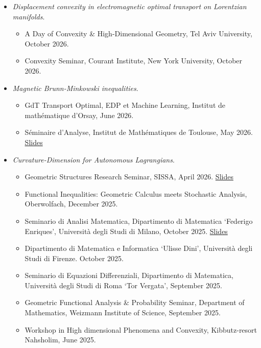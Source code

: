 \documentclass[margin, 10pt]{res}
\begin{document}
\begin{resume}
    \begin{itemize}
        \item {\it Displacement convexity in electromagnetic optimal transport on Lorentzian manifolds}.
        \begin{itemize}
            \item A Day of Convexity \& High-Dimensional Geometry, Tel Aviv University, October 2026.
            \item Convexity Seminar, Courant Institute, New York University, October 2026.
        \end{itemize}
        \item {\it Magnetic Brunn-Minkowski inequalities}.
        \begin{itemize}
            \item GdT Transport Optimal, EDP et Machine Learning, Institut de mathématique d’Orsay, June 2026.
            \item Séminaire d'Analyse, Institut de Mathématiques de Toulouse, May 2026. \href{https://rotemassouline.github.io/magnetic-bm/}{Slides}
        \end{itemize}
        \item {\it Curvature-Dimension for Autonomous Lagrangians}.
        \begin{itemize}
            \item Geometric Structures Research Seminar, SISSA, April 2026. \href{https://rotemassouline.github.io/lagrangian-cd/}{Slides}
            \item Functional Inequalities: Geometric Calculus meets Stochastic Analysis, Oberwolfach, December 2025.
            \item Seminario di Analisi Matematica, Dipartimento di Matematica `Federigo Enriques', Università degli Studi di Milano, October 2025. \href{https://rotemassouline.github.io/Italy2025/}{Slides}
            \item Dipartimento di Matematica e Informatica `Ulisse Dini', Università degli Studi di Firenze. October 2025.
            \item Seminario di Equazioni Differenziali, Dipartimento di Matematica, Università degli Studi di Roma `Tor Vergata', September 2025.
            \item Geometric Functional Analysis \& Probability Seminar, Department of Mathematics, Weizmann Institute of Science, September 2025.
            \item Workshop in High dimensional Phenomena and Convexity, Kibbutz-resort Nahsholim, June 2025.
        \end{itemize}


\end{itemize}
\end{resume}
\end{document}
